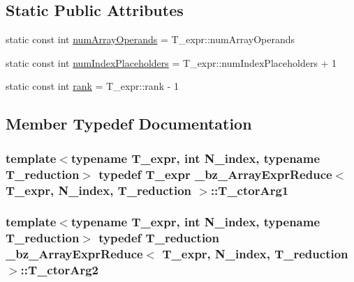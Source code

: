\subsection*{Static Public Attributes}
\begin{DoxyCompactItemize}
\item 
static const int \hyperlink{class__bz__ArrayExprReduce_a70a9110a2616687cc8d42549a20b4cab}{num\+Array\+Operands} = T\+\_\+expr\+::num\+Array\+Operands
\item 
static const int \hyperlink{class__bz__ArrayExprReduce_a62c3cf7531f22c50deaebe85d578bb93}{num\+Index\+Placeholders} = T\+\_\+expr\+::num\+Index\+Placeholders + 1
\item 
static const int \hyperlink{class__bz__ArrayExprReduce_a318d6c53b0d3f9e7ac89e47c7f18cb80}{rank} = T\+\_\+expr\+::rank -\/ 1
\end{DoxyCompactItemize}


\subsection{Member Typedef Documentation}
\hypertarget{class__bz__ArrayExprReduce_aadb6125754e2d1f858a1e5e0782ab595}{}
\subsubsection[{T\+\_\+ctor\+Arg1}]{\setlength{\rightskip}{0pt plus 5cm}template$<$typename T\+\_\+expr, int N\+\_\+index, typename T\+\_\+reduction$>$ typedef T\+\_\+expr {\bf \+\_\+bz\+\_\+\+Array\+Expr\+Reduce}$<$ T\+\_\+expr, N\+\_\+index, T\+\_\+reduction $>$\+::{\bf T\+\_\+ctor\+Arg1}}\label{class__bz__ArrayExprReduce_aadb6125754e2d1f858a1e5e0782ab595}
\hypertarget{class__bz__ArrayExprReduce_abe71b6ef29a457006514a12efbff3e9f}{}
\subsubsection[{T\+\_\+ctor\+Arg2}]{\setlength{\rightskip}{0pt plus 5cm}template$<$typename T\+\_\+expr, int N\+\_\+index, typename T\+\_\+reduction$>$ typedef T\+\_\+reduction {\bf \+\_\+bz\+\_\+\+Array\+Expr\+Reduce}$<$ T\+\_\+expr, N\+\_\+index, T\+\_\+reduction $>$\+::{\bf T\+\_\+ctor\+Arg2}}\label{class__bz__ArrayExprReduce_abe71b6ef29a457006514a12efbff3e9f}
\hypertarget{class__bz__ArrayExprReduce_a3ddc92b95f8b98391d5e09769317f1dc}{}

